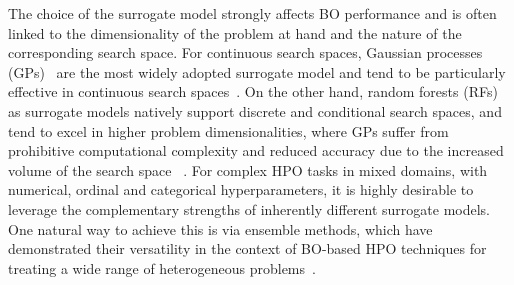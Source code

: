 The choice of the surrogate model strongly affects BO performance and is often linked to the dimensionality of the problem at hand and the nature of the corresponding search space.
For continuous search spaces, Gaussian processes (GPs)~\citep{RasWil06} are the most widely adopted surrogate model and tend to be particularly effective in continuous search spaces~\citep{EggEtAl13,EggEtAl21b,BenEtAl25}.
On the other hand, random forests (RFs)~\citep{Breiman01} as surrogate models natively support discrete and conditional search spaces, and tend to excel in higher problem dimensionalities, where GPs suffer from prohibitive computational complexity and reduced accuracy due to the increased volume of the search space
~\citep{EggEtAl13,JenEtAl17,LiEtAl18}.
For complex HPO tasks in mixed domains, with numerical, ordinal and categorical hyperparameters, it is highly desirable to leverage the complementary strengths of inherently different surrogate models.
One natural way to achieve this is via ensemble methods, which have demonstrated their versatility in the context of BO-based HPO techniques for treating a wide range of heterogeneous problems~\citep{TurEtAl20,HofEtAl11b}.




